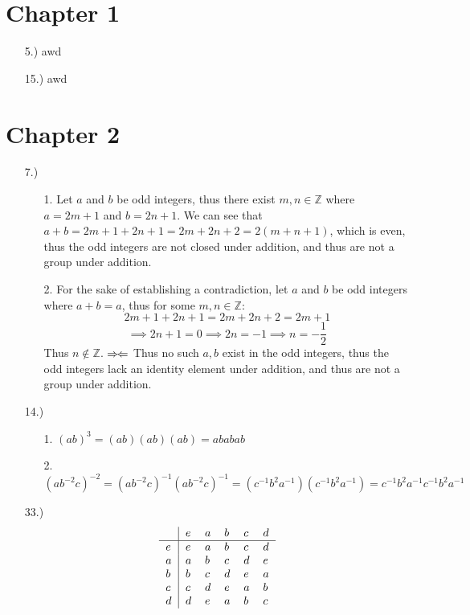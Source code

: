 \documentclass[12pt]{article}
\newcommand{\contradiction}{
    \ensuremath{{\Rightarrow\mspace{-2mu}\Leftarrow}}
}
\newcommand{\Z}{\mathbb{Z}}
\begin{document}
\pagestyle{fancy}
\fancyhead{}

\normalsize

\section*{Chapter 1}
\begin{itemize}
    \item [5.)] awd

    \item [15.)] awd

\end{itemize}

\section*{Chapter 2}
\begin{itemize}
    \item [7.)] \begin{itemize}
        \item [1.] Let $a$ and $b$ be odd integers, thus there exist $m,n\in\Z$ where $a=2m+1$ and $b=2n+1$. We can see that $a+b=2m+1+2n+1=2m+2n+2=2(m+n+1)$, which is even, thus the odd integers are not closed under addition, and thus are not a group under addition.

        \item [2.] For the sake of establishing a contradiction, let $a$ and $b$ be odd integers where $a+b=a$, thus for some $m,n\in\Z$:
        \[2m+1+2n+1=2m+2n+2=2m+1\]
        \[\implies2n+1=0\implies2n=-1\implies n=-\frac{1}{2}\]
        Thus $n\notin\Z$.\contradiction Thus no such $a,b$ exist in the odd integers, thus the odd integers lack an identity element under addition, and thus are not a group under addition.
    \end{itemize}

    \item [14.)] \begin{itemize}
        \item [1.] $(ab)^3=(ab)(ab)(ab)=ababab$

        \item [2.] $(ab^{-2}c)^{-2}=(ab^{-2}c)^{-1}(ab^{-2}c)^{-1}=(c^{-1}b^2a^{-1})(c^{-1}b^2a^{-1})=c^{-1}b^2a^{-1}c^{-1}b^2a^{-1}$
    \end{itemize}

    \item [33.)] \[
        \begin{tabular}{l|lllll}
            & $e$ & $a$ & $b$ & $c$ & $d$ \\
            \hline
            $e$ & $e$ & $a$ & $b$ & $c$ & $d$ \\
            $a$ & $a$ & $b$ & $c$ & $d$ & $e$ \\
            $b$ & $b$ & $c$ & $d$ & $e$ & $a$ \\
            $c$ & $c$ & $d$ & $e$ & $a$ & $b$ \\
            $d$ & $d$ & $e$ & $a$ & $b$ & $c$
        \end{tabular}
        \]

\end{itemize}
\end{document}

